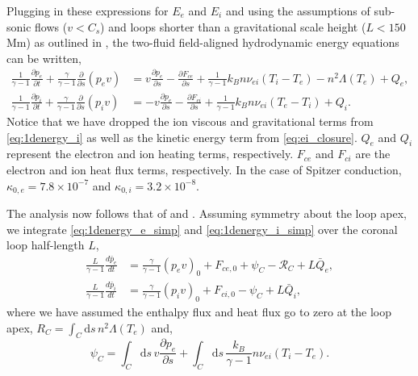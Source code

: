 
Plugging in these expressions for $E_e$ and $E_i$ and using the assumptions of sub-sonic flows ($v<C_s$) and loops shorter than a gravitational scale height ($L<150$ Mm) as outlined in \citet{klimchuk_highly_2008}, the two-fluid field-aligned hydrodynamic energy equations can be written,
\begin{align}
    \frac{1}{\gamma - 1}\frac{\partial p_e}{\partial t} + \frac{\gamma}{\gamma - 1}\frac{\partial}{\partial s}(p_ev) &= v\frac{\partial p_e}{\partial s} - \frac{\partial F_{ce}}{\partial s} + \frac{1}{\gamma - 1}k_Bn\nu_{ei}(T_i-T_e) -n^2\Lambda(T_e)+Q_{e}, \label{eq:1denergy_e_simp} \\[0.5em]
    \frac{1}{\gamma - 1}\frac{\partial p_i}{\partial t} + \frac{\gamma}{\gamma - 1}\frac{\partial }{\partial s}(p_iv)&= -v\frac{\partial p_e}{\partial s} - \frac{\partial F_{ci}}{\partial s} + \frac{1}{\gamma - 1}k_Bn\nu_{ei}(T_e-T_i) + Q_{i}. \label{eq:1denergy_i_simp}
\end{align}
Notice that we have dropped the ion viscous and gravitational terms from  \autoref{eq:1denergy_i} as well as the kinetic energy term from \autoref{eq:ei_closure}. $Q_{e}$ and $Q_{i}$ represent the electron and ion heating terms, respectively. $F_{ce}$ and $F_{ci}$ are the electron and ion heat flux terms, respectively. In the case of Spitzer conduction, $\kappa_{0,e}=7.8\times10^{-7}$ and $\kappa_{0,i}=3.2\times10^{-8}$.

The analysis now follows that of \citet{klimchuk_highly_2008} and \citet{cargill_enthalpy-based_2012}. Assuming symmetry about the loop apex, we integrate \autoref{eq:1denergy_e_simp} and \autoref{eq:1denergy_i_simp} over the coronal loop half-length $L$,
\begin{align}
    \frac{L}{\gamma - 1}\frac{d \bar{p}_e}{dt} &= \frac{\gamma}{\gamma - 1}(p_ev)_0 + F_{ce,0} + \psi_C - \mathcal{R}_C + L\bar{Q}_{e},\label{eq:1denergy_e_C} \\[0.5em]
    \frac{L}{\gamma - 1}\frac{d \bar{p}_i}{dt} &= \frac{\gamma}{\gamma - 1}(p_iv)_0 + F_{ci,0} - \psi_C + L\bar{Q}_{i},\label{eq:1denergy_i_C}
\end{align}
where we have assumed the enthalpy flux and heat flux go to zero at the loop apex, $R_C=\int_C\mathrm{d}s\,n^2\Lambda(T_e)$ and,
\begin{equation}
    \psi_C=\int_C\mathrm{d}s\,v\frac{\partial p_e}{\partial s} + \int_C\mathrm{d}s\,\frac{k_B}{\gamma - 1}n\nu_{ei}(T_i - T_e).
\end{equation}

